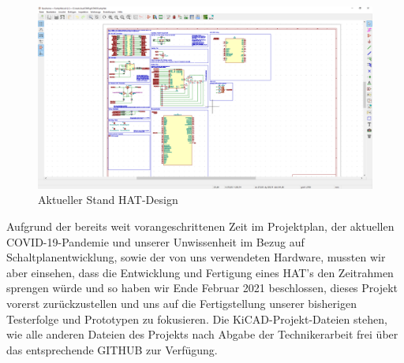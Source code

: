 \begin{figure}[H]
	\includegraphics[width=1\textwidth]{img/stand_hat.png}
	\caption[Aktueller Stand HAT-Design]{Aktueller Stand HAT-Design}
	\label{hat-design}
\end{figure}
\noindent Aufgrund der bereits weit vorangeschrittenen Zeit im Projektplan, der aktuellen COVID-19-Pandemie und unserer Unwissenheit im Bezug auf Schaltplanentwicklung, sowie der von uns verwendeten Hardware, mussten wir aber einsehen, dass die Entwicklung und Fertigung eines HAT's den Zeitrahmen sprengen würde und so haben wir Ende Februar 2021 beschlossen, dieses Projekt vorerst zurückzustellen und uns auf die Fertigstellung unserer bisherigen Testerfolge und Prototypen zu fokusieren.
Die KiCAD-Projekt-Dateien stehen, wie alle anderen Dateien des Projekts nach Abgabe der Technikerarbeit frei über das entsprechende GITHUB zur Verfügung.\par